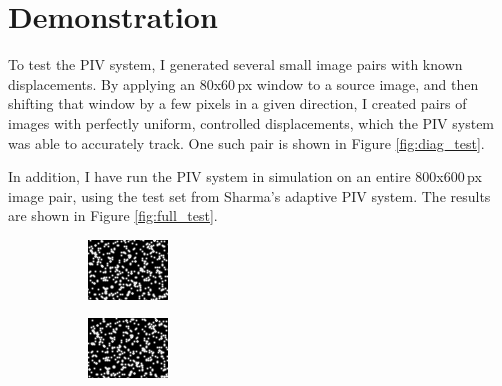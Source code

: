 \documentclass{article}
\begin{document}
\section{Demonstration}
To test the PIV system, I generated several small image pairs with known displacements. By applying an 80x60\,px window to a source image, and then shifting that window by a few pixels in a given direction, I created pairs of images with perfectly uniform, controlled displacements, which the PIV system was able to accurately track. One such pair is shown in Figure \ref{fig:diag_test}. 

In addition, I have run the PIV system in simulation on an entire 800x600\,px image pair, using the test set from Sharma's adaptive PIV system. The results are shown  in Figure \ref{fig:full_test}. 

\begin{figure}
	\centering
	\begin{subfigure}[htb]{0.45\textwidth}
		\centering
		\includegraphics[width=\textwidth]{../../data/test/x+2_y+2/A.png}
	\end{subfigure}
	\begin{subfigure}[htb]{0.45\textwidth}
		\centering
		\includegraphics[width=\textwidth]{../../data/test/x+2_y+2/B.png}
	\end{subfigure}


\end{figure}
\end{document}
